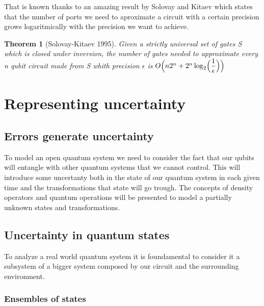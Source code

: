 \documentclass{article}
\newtheorem{theorem}{Theorem}
\begin{document}
That is known thanks to an amazing result by Solovay and Kitaev which
states
that the number of ports we need to aproximate a circuit with a certain
precision grows logaritmically with the precision we want to achieve.

\begin{theorem}[Solovay-Kitaev 1995]

	Given a strictly universal set of gates S which is closed under inversion,
	the number of gates needed to approximate every n qubit circuit made
	from S whith precision $\epsilon$ is
	$O\Bigl(n2^n+2^n\log_2 \Bigl( \dfrac{1}{\epsilon}\Bigl)\Bigl)$

\end{theorem}



\section{Representing uncertainty}

\subsection{Errors generate uncertainty}

To model an open quantum system we need to consider the fact that
our qubits will entangle with other quantum systems that we cannot control.
This will introduce some uncertanty both in the state of our quantum
system in each given time and the transformations that state will go trough.
The concepts of density operators and quantum operations will be presented to
model a partially unknown states and transformations.


\subsection{Uncertainty in quantum states}

To analyze a real world quantum system it is foundamental to consider
it a subsystem of a bigger system composed by our circuit and the
surrounding environment.

\subsubsection{Ensembles of states}
\end{document}
